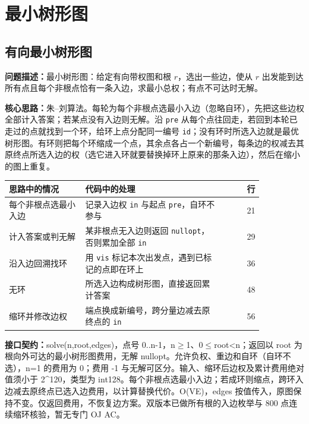 \Needspace{680pt}

\section{最小树形图}

\subsection{有向最小树形图}\label{compact-Arborescence}

\noindent\textbf{问题描述：}\allowbreak 最小树形图：给定有向带权图和根 $r$，选出一些边，使从 $r$ 出发能到达所有点且每个非根点恰有一条入边，求最小总权；有点不可达时无解。

\textbf{核心思路：}\allowbreak 朱–刘算法。每轮为每个非根点选最小入边（忽略自环），先把这些边权全部计入答案；若某点没有入边则无解。沿 \texttt{pre} 从每个点往回走，若回到本轮已走过的点就找到一个环，给环上点分配同一编号 \texttt{id}；没有环时所选入边就是最优树形图。有环则把每个环缩成一个点，其余点各占一个新编号，每条边的权减去其原终点所选入边的权（选它进入环就要替换掉环上原来的那条入边），然后在缩小的图上重复。

\begin{center}\small
\begin{tabular}{@{}p{0.30\linewidth}p{0.55\linewidth}r@{}}
\toprule
思路中的情况 & 代码中的处理 & 行\\
\midrule
每个非根点选最小入边 & 记录入边权 \texttt{in} 与起点 \texttt{pre}，自环不参与 & 21\\
计入答案或判无解 & 某非根点无入边则返回 \texttt{nullopt}，否则累加全部 \texttt{in} & 29\\
沿入边回溯找环 & 用 \texttt{vis} 标记本次出发点，遇到已标记的点即在环上 & 36\\
无环 & 所选入边构成树形图，直接返回累计答案 & 48\\
缩环并修改边权 & 端点换成新编号，跨分量边减去原终点的 \texttt{in} & 56\\
\bottomrule
\end{tabular}
\end{center}



{\sloppy{}\noindent\textbf{接口契约：}solve(n,root,edges)，点号 0..n-1，n$\ge$1、0$\le$root<n；返回以 root 为根向外可达的最小树形图费用，无解 nullopt。允许负权、重边和自环（自环不选），n=1 的费用为 0；费用 -1 与无解可区分。输入、缩环后边权及累计费用绝对值须小于 2\textasciicircum{}120，类型为 int128。每个非根点选最小入边；若成环则缩点，跨环入边减去原终点已选入边费用，以计算替换代价。O(VE)，edges 按值传入，原图保持不变。仅返回费用，不恢复边方案。双版本已做所有根的入边枚举与 800 点连续缩环核验，暂无专门 OJ AC。\par}

